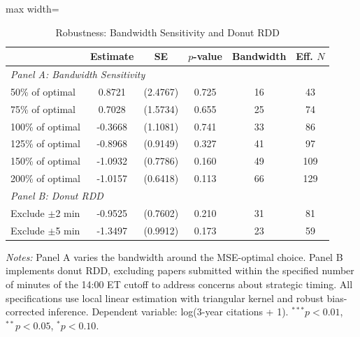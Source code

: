 \begin{table}[htbp]
\centering
\caption{Robustness: Bandwidth Sensitivity and Donut RDD}
\label{tab:robustness}
\begin{adjustbox}{max width=\textwidth}
\begin{tabular}{lccccc}
\hline\hline
& Estimate & SE & $p$-value & Bandwidth & Eff. $N$ \\
\hline
\multicolumn{6}{l}{\textit{Panel A: Bandwidth Sensitivity}} \\
50\% of optimal & 0.8721 & (2.4767) & 0.725 & 16 & 43 \\
75\% of optimal & 0.7028 & (1.5734) & 0.655 & 25 & 74 \\
100\% of optimal & -0.3668 & (1.1081) & 0.741 & 33 & 86 \\
125\% of optimal & -0.8968 & (0.9149) & 0.327 & 41 & 97 \\
150\% of optimal & -1.0932 & (0.7786) & 0.160 & 49 & 109 \\
200\% of optimal & -1.0157 & (0.6418) & 0.113 & 66 & 129 \\
\hline
\multicolumn{6}{l}{\textit{Panel B: Donut RDD}} \\
Exclude $\pm$2 min & -0.9525 & (0.7602) & 0.210 & 31 & 81 \\
Exclude $\pm$5 min & -1.3497 & (0.9912) & 0.173 & 23 & 59 \\
\hline\hline
\end{tabular}
\end{adjustbox}
\begin{minipage}{0.95\textwidth}
\footnotesize
\textit{Notes:} Panel A varies the bandwidth around the MSE-optimal choice. Panel B implements donut RDD, excluding papers submitted within the specified number of minutes of the 14:00 ET cutoff to address concerns about strategic timing. All specifications use local linear estimation with triangular kernel and robust bias-corrected inference. Dependent variable: log(3-year citations + 1). $^{***}p<0.01$, $^{**}p<0.05$, $^{*}p<0.10$.
\end{minipage}
\end{table}
